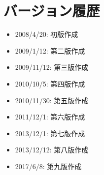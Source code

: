 \documentclass[11pt,titlepage,uplatex]{ujreport}
\begin{document}
%
%
%
%

\chapter{バージョン履歴}
\begin{itemize}
  \item 2008/4/20: 初版作成
  \item 2009/1/12: 第二版作成
  \item 2009/11/12: 第三版作成
  \item 2010/10/5: 第四版作成
  \item 2010/11/30: 第五版作成
  \item 2011/12/1: 第六版作成
  \item 2013/12/1: 第七版作成
  \item 2013/12/12: 第八版作成
  \item 2017/6/8: 第九版作成
\end{itemize}
\end{document}
